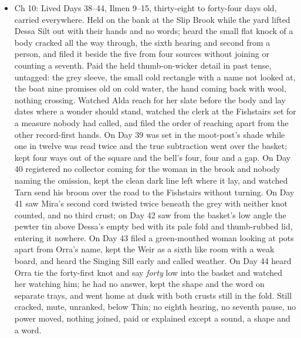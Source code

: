 \documentclass{design/chronicle}
\begin{document}
{\begin{itemize}[leftmargin=1.4em,itemsep=1pt,topsep=3pt,parsep=0pt]
\end{itemize}

\begin{itemize}[leftmargin=1.4em,itemsep=1pt,topsep=3pt,parsep=0pt]

\item Ch 10: Lived Days 38–44, Ilmen 9–15, thirty-eight to forty-four days old, carried everywhere. Held on the bank at the Slip Brook while the yard lifted Dessa Silt out with their hands and no words; heard the small flat knock of a body cracked all the way through, the sixth hearing and second from a person, and filed it beside the five from four sources without joining or counting a seventh. Paid the held thumb-on-wicker detail in past tense, untagged: the grey sleeve, the small cold rectangle with a name not looked at, the boat nine promises old on cold water, the hand coming back with wool, nothing crossing. Watched Alda reach for her slate before the body and lay dates where a wonder should stand, watched the clerk at the Fishstairs set for a measure nobody had called, and filed the order of reaching apart from the other record-first hands. On Day 39 was set in the moot-post’s shade while one in twelve was read twice and the true subtraction went over the basket; kept four ways out of the square and the bell’s four, four and a gap. On Day 40 registered no collector coming for the woman in the brook and nobody naming the omission, kept the clean dark line left where it lay, and watched Tarn send his broom over the road to the Fishstairs without turning. On Day 41 saw Mira’s second cord twisted twice beneath the grey with neither knot counted, and no third crust; on Day 42 saw from the basket’s low angle the pewter tin above Dessa’s empty bed with its pale fold and thumb-rubbed lid, entering it nowhere. On Day 43 filed a green-mouthed woman looking at pots apart from Orra’s name, kept the Weir as a sixth like room with a weak board, and heard the Singing Sill early and called weather. On Day 44 heard Orra tie the forty-first knot and say \emph{forty} low into the basket and watched her watching him; he had no answer, kept the shape and the word on separate trays, and went home at dusk with both crusts still in the fold. Still cracked, mute, unranked, below Thin; no eighth hearing, no seventh pause, no power moved, nothing joined, paid or explained except a sound, a shape and a word.

\end{itemize}
}
\end{document}
